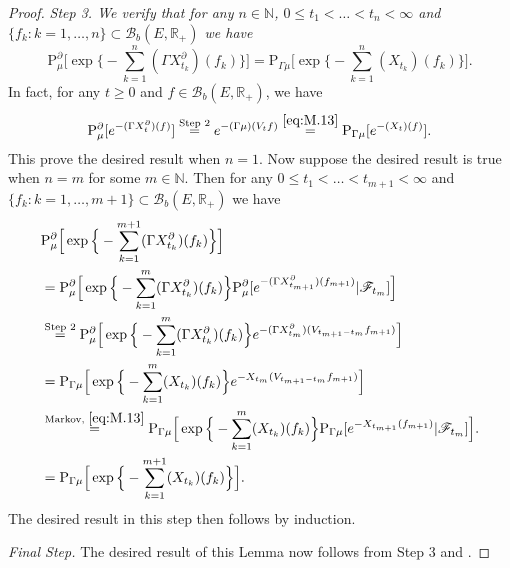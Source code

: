 \documentclass[12pt,a4paper]{amsart}
\numberwithin{equation}{section}
\theoremstyle{plain}
\theoremstyle{definition}
\theoremstyle{remark}
\begin{document}
\begin{proof}
	\emph{Step 3. We verify that for any $n\in \mathbb N$, $0\leq t_1 < \dots <t_n<\infty$ and $\{f_k: k = 1,\dots,n\}\subset \mathcal B_b(E,\mathbb R_+)$ we have}
\[
	\mathrm P_\mu^\partial \Big[\exp \Big\{- \sum_{k=1}^n(\Gamma X_{t_k}^\partial)(f_k)\Big\}\Big]
	= \mathrm P_{\Gamma \mu} \Big[\exp \Big\{- \sum_{k=1}^n( X_{t_k})(f_k)\Big\}\Big].
\]
	In fact, for any $t\geq 0$ and $f\in  \mathcal B_b(E,\mathbb R_+)$, we have
\[
	\mathrm P_\mu^\partial [e^{- (\Gamma X_{t}^\partial)(f)}]
	\overset{\text{Step 2}}= e^{- (\Gamma \mu)(V_{t}f)}
	\overset{\eqref{eq:M.13}}= \mathrm P_{\Gamma \mu} [e^{- ( X_{t})(f)}].
\]
	This prove the desired result when $n=1$. 
	Now suppose the desired result is true when $n=m$ for some $m\in \mathbb N$.  
	Then for any $0\leq t_1 < \dots <t_{m+1}<\infty$ and $\{f_k: k = 1,\dots, m+1\}\subset \mathcal B_b(E,\mathbb R_+)$ we have
\begin{align}
	&\mathrm P_\mu^\partial \Big[\exp \Big\{- \sum_{k=1}^{m+1}(\Gamma X_{t_k}^\partial)(f_k)\Big\} \Big]
	\\&= \mathrm P_\mu^\partial \Big[\exp \Big\{- \sum_{k=1}^{m}(\Gamma X_{t_k}^\partial)(f_k)\Big\} \mathrm P_\mu^\partial[e^{-(\Gamma X^\partial_{t_{m+1}}) (f_{m+1})}|\mathscr F_{t_m}]\Big]
	\\&\overset{\text{Step 2}} = \mathrm P_\mu^\partial \Big[\exp \Big\{- \sum_{k=1}^{m}(\Gamma X_{t_k}^\partial)(f_k)\Big\} e^{- (\Gamma X_{t_m}^\partial)(V_{t_{m+1}-t_m}f_{m+1})}\Big]
	\\&= \mathrm P_{\Gamma \mu} \Big[\exp \Big\{- \sum_{k=1}^{m}( X_{t_k})(f_k)\Big\}e^{-X_{t_m}(V_{t_{m+1}-t_m}f_{m+1})}\Big]
	\\&\overset{\text{Markov, }\eqref{eq:M.13}}= \mathrm P_{\Gamma \mu} \Big[\exp \Big\{- \sum_{k=1}^{m}( X_{t_k})(f_k)\Big\}\mathrm P_{\Gamma \mu}[e^{-X_{t_{m+1}}(f_{m+1})}|\mathscr F_{t_m}]\Big].
	\\& = \mathrm P_{\Gamma \mu} \Big[\exp \Big\{- \sum_{k=1}^{m+1}( X_{t_k})(f_k)\Big\}\Big].
\end{align}
	The desired result in this step then follows by induction.
	
\emph{Final Step.} The desired result of this Lemma now follows from Step 3 and \cite[Theorem 1.17]{Li2011Measure-valued}.
\end{proof}
\end{document}
